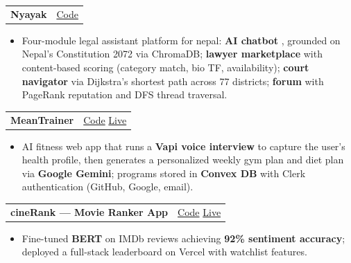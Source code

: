 \documentclass[10.5pt, a4paper]{article}
\makeatletter
\newcommand{\proj}[3]{%
  \vspace{1pt}%
  \begin{tabularx}{\linewidth}{@{}X r@{}}
    \textbf{#1}\enspace{\small\color{mid}\textit{#2}} & {\small #3}
  \end{tabularx}\vspace{0pt}}
\makeatother
\begin{document}
\proj{Nyayak }
     {--- Full stack AI application(FYP)}
     {\href{https://github.com/paudelsamir/nyayak}{Code}}

\begin{itemize}
  \item Four-module legal assistant platform for nepal: \textbf{AI chatbot} , grounded on
        Nepal's Constitution 2072 via ChromaDB; \textbf{lawyer marketplace}
        with content-based scoring (category match, bio TF, availability);
        \textbf{court navigator} via Dijkstra's shortest path across 77
        districts; \textbf{forum} with PageRank reputation and DFS thread traversal.
\end{itemize}

\vspace{4pt}

\proj{MeanTrainer}
     {--- Full-Stack GenAI Application}
     {\href{https://github.com/paudelsamir/meantrainer}{Code}
      \enspace\textbar\enspace
      \href{https://meantrainer.vercel.app/}{Live}}

\begin{itemize}
  \item AI fitness web app that runs a \textbf{Vapi voice interview} to capture the user's
        health profile, then generates a personalized weekly gym plan and diet plan
        via \textbf{Google Gemini}; programs stored in \textbf{Convex DB} with
        Clerk authentication (GitHub, Google, email).
\end{itemize}

\vspace{4pt}


\proj{cineRank --- Movie Ranker App}
     {--- NLP \& Sentiment Analysis}
     {\href{https://github.com/paudelsamir/365DaysOfData/tree/main/10-Projects-Based-ML-DL/04-Sentiment-Analysis}{Code}
      \enspace\textbar\enspace
      \href{https://cine-rank.vercel.app}{Live}}

\begin{itemize}
  \item Fine-tuned \textbf{BERT} on IMDb reviews achieving \textbf{92\% sentiment accuracy};
        deployed a full-stack leaderboard on Vercel with watchlist features.
\end{itemize}

\vspace{4pt}
\end{document}
